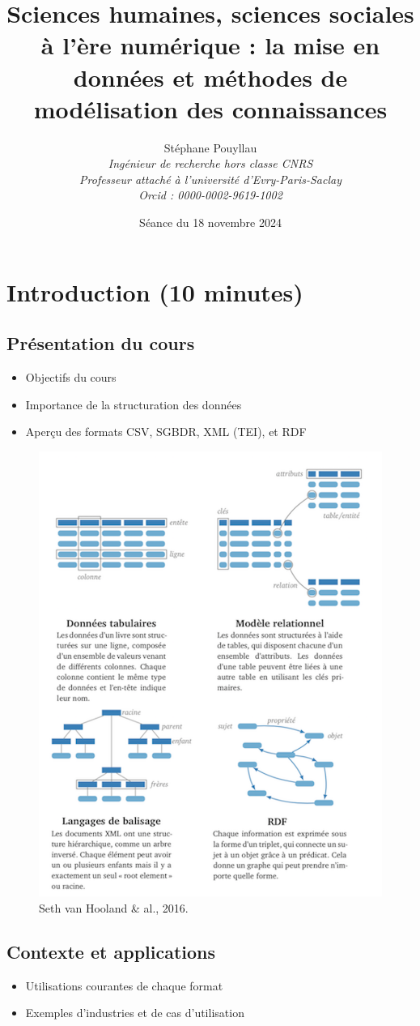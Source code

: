 \documentclass{article}
\title{Sciences humaines, sciences sociales à l'ère numérique : la mise en données et méthodes de modélisation des connaissances}
\author{
    Stéphane Pouyllau\\
    \textit{Ingénieur de recherche hors classe CNRS} \\
    \textit{Professeur attaché à l'université d'Evry-Paris-Saclay}\\
    \textit{Orcid : 0000-0002-9619-1002}
}
\date{Séance du 18 novembre 2024}
\begin{document}
\maketitle

\section{Introduction (10 minutes)}
\subsection{Présentation du cours}
\begin{itemize}
    \item Objectifs du cours
    \item Importance de la structuration des données\cite{hooland2016}
    \item Aperçu des formats CSV, SGBDR, XML (TEI), et RDF  
\end{itemize}

\begin{figure}
    \centering
    \includegraphics[width=0.5\linewidth]{fig/Setl.png}
    \caption{Seth van Hooland \& al., 2016.}
    \label{fig:enter-label}
\end{figure}

\subsection{Contexte et applications}
\begin{itemize}
    \item Utilisations courantes de chaque format
    \item Exemples d'industries et de cas d'utilisation
\end{itemize}
\end{document}
